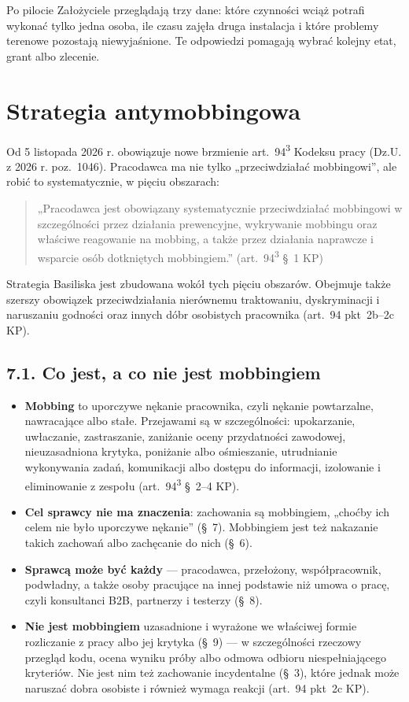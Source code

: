 \documentclass[11pt,a4paper]{report}
\begin{document}
Po pilocie Założyciele przeglądają trzy dane: które czynności wciąż potrafi wykonać tylko jedna osoba, ile czasu zajęła druga instalacja i które problemy terenowe pozostają niewyjaśnione. Te odpowiedzi pomagają wybrać kolejny etat, grant albo zlecenie.

\section{Strategia antymobbingowa}
\label{sec:mobbing}

Od 5 listopada 2026 r. obowiązuje nowe brzmienie art.~94\textsuperscript{3} Kodeksu pracy (Dz.U. z 2026 r. poz.~1046). Pracodawca ma nie tylko „przeciwdziałać mobbingowi”, ale robić to systematycznie, w pięciu obszarach:
\begin{quote}
„Pracodawca jest obowiązany systematycznie przeciwdziałać mobbingowi w szczególności przez działania prewencyjne, wykrywanie mobbingu oraz właściwe reagowanie na mobbing, a także przez działania naprawcze i wsparcie osób dotkniętych mobbingiem.” (art.~94\textsuperscript{3} §~1 KP)
\end{quote}
Strategia Basiliska jest zbudowana wokół tych pięciu obszarów. Obejmuje także szerszy obowiązek przeciwdziałania nierównemu traktowaniu, dyskryminacji i naruszaniu godności oraz innych dóbr osobistych pracownika (art.~94 pkt~2b--2c KP).

\subsection*{7.1. Co jest, a co nie jest mobbingiem}
\begin{itemize}
  \item \textbf{Mobbing} to uporczywe nękanie pracownika, czyli nękanie powtarzalne, nawracające albo stałe. Przejawami są w szczególności: upokarzanie, uwłaczanie, zastraszanie, zaniżanie oceny przydatności zawodowej, nieuzasadniona krytyka, poniżanie albo ośmieszanie, utrudnianie wykonywania zadań, komunikacji albo dostępu do informacji, izolowanie i eliminowanie z zespołu (art.~94\textsuperscript{3} §~2--4 KP).
  \item \textbf{Cel sprawcy nie ma znaczenia}: zachowania są mobbingiem, „choćby ich celem nie było uporczywe nękanie” (§~7). Mobbingiem jest też nakazanie takich zachowań albo zachęcanie do nich (§~6).
  \item \textbf{Sprawcą może być każdy} --- pracodawca, przełożony, współpracownik, podwładny, a także osoby pracujące na innej podstawie niż umowa o pracę, czyli konsultanci B2B, partnerzy i testerzy (§~8).
  \item \textbf{Nie jest mobbingiem} uzasadnione i wyrażone we właściwej formie rozliczanie z pracy albo jej krytyka (§~9) --- w szczególności rzeczowy przegląd kodu, ocena wyniku próby albo odmowa odbioru niespełniającego kryteriów. Nie jest nim też zachowanie incydentalne (§~3), które jednak może naruszać dobra osobiste i również wymaga reakcji (art.~94 pkt~2c KP).
\end{itemize}
\end{document}
